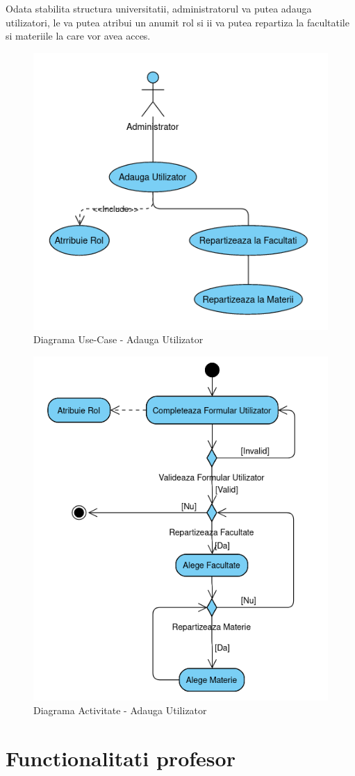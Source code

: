 \documentclass[12pt, a4paper, oneside, romanian]{teza-upb}
\begin{document}
Odata stabilita structura universitatii, administratorul va putea adauga utilizatori, le va putea atribui un anumit rol si ii va putea repartiza la facultatile si materiile la care vor avea acces.

\begin{figure}[H]
\centering
\includegraphics*[width=0.525\columnwidth]{diagrama-use-case-adauga-utilizator}
\caption{Diagrama Use-Case - Adauga Utilizator}
\label{diagrama-use-case-adauga-utilizator}
\end{figure}


\begin{figure}[H]
\centering
\includegraphics*[width=0.6\columnwidth]{diagrama-activitate-adauga-utilizator}
\caption{Diagrama Activitate - Adauga Utilizator}
\label{diagrama-activitate-adauga-utilizator}
\end{figure}

\section{Functionalitati profesor}
\end{document}
